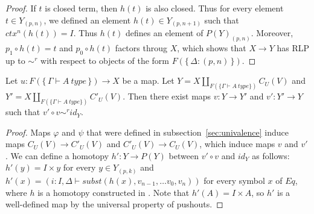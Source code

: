 \documentclass[reqno]{amsart}
\theoremstyle{definition}
\theoremstyle{remark}
\numberwithin{figure}{section}
\begin{document}
\begin{proof}
If $t$ is closed term, then $h(t)$ is also closed.
Thus for every element $t \in Y_{(p,n)}$, we defined an element $h(t) \in Y_{(p,n+1)}$ such that $ctx^n(h(t)) = I$.
Thus $h(t)$ defines an element of $P(Y)_{(p,n)}$.
Moreover, $p_1 \circ h(t) = t$ and $p_0 \circ h(t)$ factors throug $X$,
which shows that $X \to Y$ has RLP up to $\sim^r$ with respect to objects of the form $F(\{\,\Delta : (p,n)\,\})$.
\end{proof}

\begin{lem}[Jhom]
Let $u : F(\{\,\Gamma \vdash A\ type\,\}) \to X$ be a map.
Let $Y = X \amalg_{F(\{ \Gamma \vdash A\ type \})} C_U(V)$ and $Y' = X \amalg_{F(\{ \Gamma \vdash A\ type \})} C'_U(V)$.
Then there exist maps $v : Y \to Y'$ and $v' : Y' \to Y$ such that $v' \circ v \sim^r id_Y$.
\end{lem}
\begin{proof}
Maps $\varphi$ and $\psi$ that were defined in subsection~\ref{sec:univalence} induce maps $C_U(V) \to C'_U(V)$ and $C'_U(V) \to C_U(V)$, which induce maps $v$ and $v'$.
We can define a homotopy $h' : Y \to P(Y)$ between $v' \circ v$ and $id_Y$ as follows: $h'(y) = I \times y$ for every $y \in Y_{(p,k)}$
and $h'(x) = (i : I, \Delta \vdash subst(h(x), v_{n-1}, \ldots v_0, v_n))$ for every symbol $x$ of $Eq$,
where $h$ is a homotopy constructed in .
Note that $h'(A) = I \times A$, so $h'$ is a well-defined map by the universal property of pushouts.
\end{proof}
\end{document}
